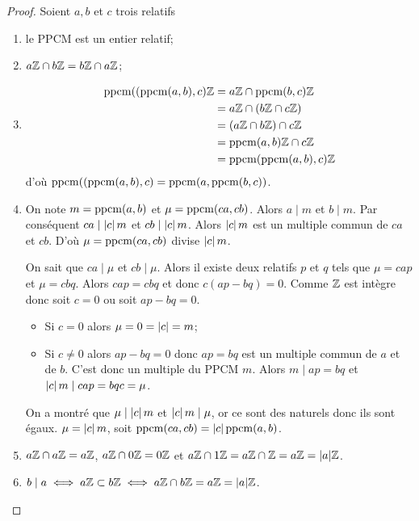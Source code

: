\begin{proof}
  Soient \(a,b\) et \(c\) trois relatifs
  \begin{enumerate}
    \item le PPCM est un entier relatif;
    \item \(a\mathbb{Z} \cap b\mathbb{Z} = b\mathbb{Z} \cap a\mathbb{Z}\);
    \item
      \begin{align}
        \operatorname{ppcm}((\operatorname{ppcm}(a,b),c) \mathbb{Z} &= a\mathbb{Z} \cap \operatorname{ppcm}(b,c) \mathbb{Z} \\ &= a\mathbb{Z} \cap (b\mathbb{Z} 
        \cap c\mathbb{Z})\\ &= (a\mathbb{Z} \cap b\mathbb{Z}) \cap c\mathbb{Z} \\ &= \operatorname{ppcm}(a,b) \mathbb{Z} \cap c\mathbb{Z} \\ 
        &=\operatorname{ppcm}(\operatorname{ppcm}(a,b),c) \mathbb{Z}
      \end{align}
      d'où \(\operatorname{ppcm}((\operatorname{ppcm}(a,b),c)=\operatorname{ppcm}(a,\operatorname{ppcm}(b,c))\).
    \item On note \(m=\operatorname{ppcm}(a,b)\) et \(\mu=\operatorname{ppcm}(ca,cb)\). Alors \(a \mid m\) 
      et \(b \mid m\). Par conséquent \(ca \mid \left\lvert c\right\rvert m\) et \(cb \mid 
      \left\lvert c\right\rvert m\). Alors \(\left\lvert c\right\rvert m\) est un multiple commun de \(ca\) et \(cb\). 
      D'où \(\mu=\operatorname{ppcm}(ca,cb)\) divise \(\left\lvert c\right\rvert m\).

      On sait que \(ca \mid \mu\) et \(cb \mid \mu\). Alors il existe deux 
      relatifs \(p\) et \(q\) tels que \(\mu = cap\) et \(\mu=cbq\). Alors 
      \(cap=cbq\) et donc \(c(ap-bq)=0\). Comme \(\mathbb{Z}\) est intègre donc soit 
      \(c=0\) ou soit \(ap-bq=0\).
      \begin{itemize}
        \item Si \(c=0\) alors \(\mu=0=\left\lvert c\right\rvert=m\);
      \item Si \(c \neq 0\) alors \(ap-bq=0\) donc \(ap=bq\) est un multiple 
      commun de \(a\) et de \(b\). C'est donc un multiple du PPCM \(m\). Alors 
      \(m \mid ap=bq\) et \(\left\lvert c\right\rvert m \mid cap = bqc=\mu\). \end{itemize}
      On a montré que \(\mu \mid \left\lvert c\right\rvert m\) et \(\left\lvert c\right\rvert m \mid \mu\), or ce 
      sont des naturels donc ils sont égaux. \(\mu=\left\lvert c\right\rvert m\), soit 
      \(\operatorname{ppcm}(ca,cb)=\left\lvert c\right\rvert\operatorname{ppcm}(a,b)\).
    \item \(a\mathbb{Z} \cap a\mathbb{Z} = a\mathbb{Z}\), \(a\mathbb{Z} \cap 0\mathbb{Z} = 0\mathbb{Z}\) et \(a\mathbb{Z} \cap 1\mathbb{Z} = a\mathbb{Z} 
      \cap \mathbb{Z}=a\mathbb{Z}=|a|\mathbb{Z}\).
    \item \(b \mid a \iff a\mathbb{Z} \subset b\mathbb{Z} \iff a\mathbb{Z} \cap b\mathbb{Z} = a\mathbb{Z}=|a|\mathbb{Z}\).
  \end{enumerate}
\end{proof}

